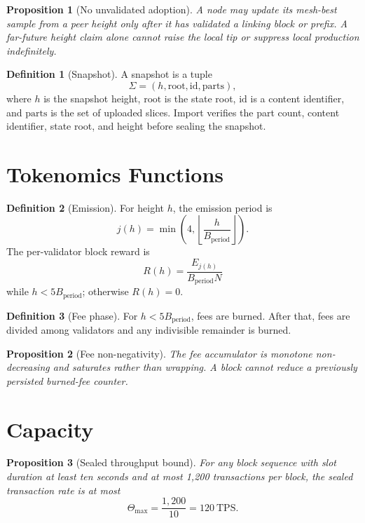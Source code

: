 \documentclass[11pt,a4paper]{article}
\theoremstyle{definition}
\newtheorem{definition}{Definition}[section]
\theoremstyle{plain}
\newtheorem{proposition}{Proposition}[section]
\begin{document}
\begin{proposition}[No unvalidated adoption]
A node may update its mesh-best sample from a peer height only after it has
validated a linking block or prefix. A far-future height claim alone cannot
raise the local tip or suppress local production indefinitely.
\end{proposition}

\begin{definition}[Snapshot]
A snapshot is a tuple
\[
  \Sigma=(h,\mathrm{root},\mathrm{id},\mathrm{parts}),
\]
where $h$ is the snapshot height, $\mathrm{root}$ is the state root,
$\mathrm{id}$ is a content identifier, and $\mathrm{parts}$ is the set of
uploaded slices. Import verifies the part count, content identifier, state
root, and height before sealing the snapshot.
\end{definition}

\section{Tokenomics Functions}

\begin{definition}[Emission]
For height $h$, the emission period is
\[
  j(h)=\min\left(4,\left\lfloor\frac{h}{B_{\mathrm{period}}}\right\rfloor\right).
\]
The per-validator block reward is
\[
  R(h)=\frac{E_{j(h)}}{B_{\mathrm{period}}N}
\]
while $h<5B_{\mathrm{period}}$; otherwise $R(h)=0$.
\end{definition}

\begin{definition}[Fee phase]
For $h<5B_{\mathrm{period}}$, fees are burned. After that, fees are divided
among validators and any indivisible remainder is burned.
\end{definition}

\begin{proposition}[Fee non-negativity]
The fee accumulator is monotone non-decreasing and saturates rather than
wrapping. A block cannot reduce a previously persisted burned-fee counter.
\end{proposition}

\section{Capacity}

\begin{proposition}[Sealed throughput bound]
For any block sequence with slot duration at least ten seconds and at most
1,200 transactions per block, the sealed transaction rate is at most
\[
  \Theta_{\max}=\frac{1{,}200}{10}=120\ \mathrm{TPS}.
\]
\end{proposition}
\end{document}
